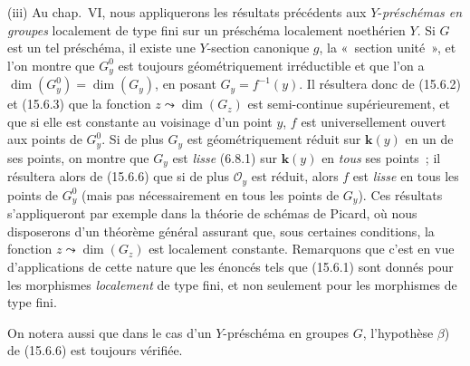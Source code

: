 \begin{remarks}[15.6.10]
(iii) Au chap.~VI, nous appliquerons les résultats précédents aux $Y$-\emph{préschémas en groupes} localement de type fini sur un préschéma localement noethérien $Y$. Si $G$ est un tel préschéma, il existe une $Y$-section canonique $g$, la «~section unité~», et l'on montre que $G_y^0$ est toujours géométriquement irréductible et que l'on a $\dim(G_y^0)=\dim(G_y)$, en posant $G_y=f^{-1}(y)$. Il résultera donc de (15.6.2) et (15.6.3) que la fonction $z\leadsto\dim(G_z)$ est semi-continue supérieurement, et que si elle est constante au voisinage d'un point $y$, $f$ est universellement ouvert aux points de $G_y^0$. Si de plus $G_y$ est géométriquement réduit sur $\boldsymbol{k}(y)$ en un de ses points, on montre que $G_y$ est \emph{lisse} (6.8.1) sur $\boldsymbol{k}(y)$ en \emph{tous} ses points~; il résultera alors de (15.6.6) que si de plus $\mathcal O_y$ est réduit, alors $f$ est \emph{lisse} en tous les points de $G_y^0$ (mais pas nécessairement en tous les points de $G_y$). Ces résultats s'appliqueront par exemple dans la théorie de schémas de Picard, où nous disposerons d'un théorème général assurant que, sous certaines conditions, la fonction $z\leadsto\dim(G_z)$ est localement constante. Remarquons que c'est en vue d'applications de cette nature que les énoncés tels que (15.6.1) sont donnés pour les morphismes \emph{localement} de type fini, et non seulement pour les morphismes de type fini.

On notera aussi que dans le cas d'un $Y$-préschéma en groupes $G$, l'hypothèse $\beta$) de (15.6.6) est toujours vérifiée.
\end{remarks}


